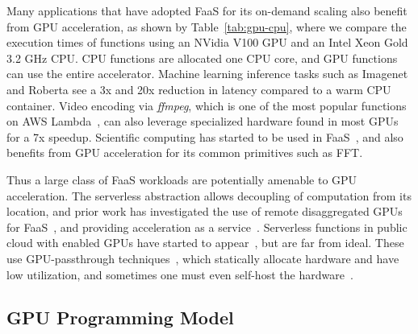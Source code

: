 Many applications that have adopted FaaS for its on-demand scaling also benefit from GPU acceleration, as shown by Table~\ref{tab:gpu-cpu}, where we compare the execution times of functions using an NVidia V100 GPU and an Intel Xeon Gold 3.2 GHz CPU.
CPU functions are allocated one CPU core, and GPU functions can use the entire accelerator.
Machine learning inference tasks such as Imagenet and Roberta see a 3x and 20x reduction in latency compared to a warm CPU container. 
Video encoding via \emph{ffmpeg}, which is one of the most popular functions on AWS Lambda~\cite{aws-netflix}, can also leverage specialized hardware found in most GPUs for a 7x speedup. 
Scientific computing has started to be used in FaaS~\cite{john_sweep_2019,mocskos_faaster_2018,werner2018serverless,shankar2020serverless}, and also benefits from GPU acceleration for its common primitives such as FFT.


Thus a large class of FaaS workloads are potentially amenable to GPU acceleration.
The serverless abstraction allows decoupling of computation from its location, and prior work has investigated the use of remote disaggregated GPUs for FaaS~\cite{naranjo2020accelerated,fingler2022dgsf}, and providing acceleration as a service~\cite{varghese2015acceleration,du2022serverless}.
Serverless functions in public cloud with enabled GPUs have started to appear~\cite{azure-gpu-function,alibaba-gpu-function}, but are far from ideal.
These use GPU-passthrough techniques~\cite{alibaba-gpu-noshare}, which statically allocate hardware and have low utilization, and sometimes one must even self-host the hardware~\cite{azure-gpu-function}.


\vspace*{\subsecspace}
\subsection{GPU Programming Model}

